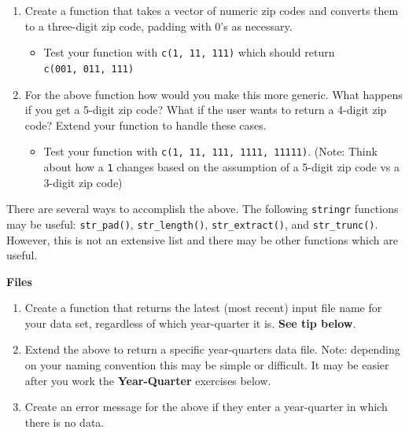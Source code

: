 \documentclass[]{book}
\providecommand{\tightlist}{%
  \setlength{\itemsep}{0pt}\setlength{\parskip}{0pt}}
\let\BeginKnitrBlock\begin \let\EndKnitrBlock\end
\begin{document}
\begin{enumerate}
\def\labelenumi{\arabic{enumi}.}
\tightlist
\item
  Create a function that takes a vector of numeric zip codes and
  converts them to a three-digit zip code, padding with 0's as
  necessary.

  \begin{itemize}
  \tightlist
  \item
    Test your function with \texttt{c(1,\ 11,\ 111)} which should return
    \texttt{c(001,\ 011,\ 111)}
  \end{itemize}
\item
  For the above function how would you make this more generic. What
  happens if you get a 5-digit zip code? What if the user wants to
  return a 4-digit zip code? Extend your function to handle these cases.

  \begin{itemize}
  \tightlist
  \item
    Test your function with \texttt{c(1,\ 11,\ 111,\ 1111,\ 11111)}.
    (Note: Think about how a \texttt{1} changes based on the assumption
    of a 5-digit zip code vs a 3-digit zip code)
  \end{itemize}
\end{enumerate}

\BeginKnitrBlock{rmdtip}
There are several ways to accomplish the above. The following
\texttt{stringr} functions may be useful: \texttt{str\_pad()},
\texttt{str\_length()}, \texttt{str\_extract()}, and
\texttt{str\_trunc()}. However, this is not an extensive list and there
may be other functions which are useful.
\EndKnitrBlock{rmdtip}

\textbf{Files}

\begin{enumerate}
\def\labelenumi{\arabic{enumi}.}
\tightlist
\item
  Create a function that returns the latest (most recent) input file
  name for your data set, regardless of which year-quarter it is.
  \textbf{See tip below}.
\item
  Extend the above to return a specific year-quarters data file. Note:
  depending on your naming convention this may be simple or difficult.
  It may be easier after you work the \textbf{Year-Quarter} exercises
  below.
\item
  Create an error message for the above if they enter a year-quarter in
  which there is no data.
\end{enumerate}
\end{document}
